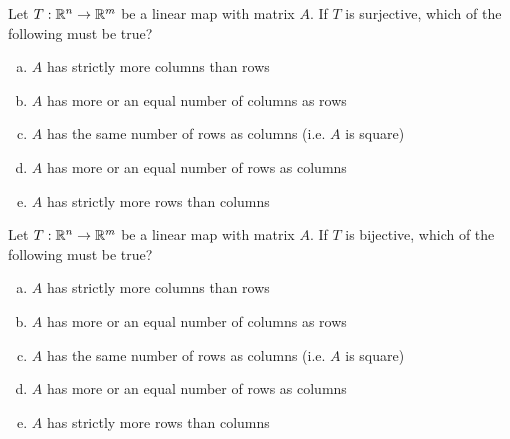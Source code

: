 \begin{applicationActivities}{2}{22}
\begin{activity}{5}
Let $T: \mathbb{R}^n \rightarrow \mathbb{R}^m$ be a linear map with matrix $A$.
If $T$ is surjective, which of the following must be true?
\begin{enumerate}[(a)]
\item $A$ has strictly more columns than rows
\item $A$ has more or an equal number of columns as rows
\item $A$ has the same number of rows as columns (i.e. $A$ is square)
\item $A$ has more or an equal number of rows as columns
\item $A$ has strictly more rows than columns
\end{enumerate}
\end{activity}

\begin{activity}{5}
Let $T: \mathbb{R}^n \rightarrow \mathbb{R}^m$ be a linear map with matrix $A$.
If $T$ is bijective, which of the following must be true?
\begin{enumerate}[(a)]
\item $A$ has strictly more columns than rows
\item $A$ has more or an equal number of columns as rows
\item $A$ has the same number of rows as columns (i.e. $A$ is square)
\item $A$ has more or an equal number of rows as columns
\item $A$ has strictly more rows than columns
\end{enumerate}
\end{activity}

\end{applicationActivities}
